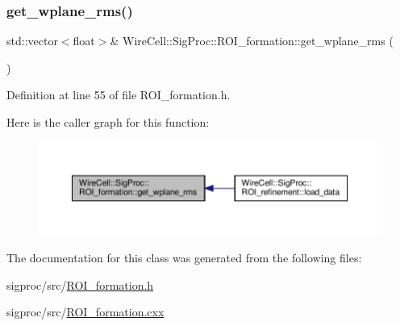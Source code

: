\subsubsection{\texorpdfstring{get\+\_\+wplane\+\_\+rms()}{get\_wplane\_rms()}}
{\footnotesize\ttfamily std\+::vector$<$float$>$\& Wire\+Cell\+::\+Sig\+Proc\+::\+R\+O\+I\+\_\+formation\+::get\+\_\+wplane\+\_\+rms (\begin{DoxyParamCaption}{ }\end{DoxyParamCaption})\hspace{0.3cm}{\ttfamily [inline]}}



Definition at line 55 of file R\+O\+I\+\_\+formation.\+h.

Here is the caller graph for this function\+:
\nopagebreak
\begin{figure}[H]
\begin{center}
\leavevmode
\includegraphics[width=350pt]{class_wire_cell_1_1_sig_proc_1_1_r_o_i__formation_afe5f0a8059b5d5b9b7e34077fea64c0a_icgraph}
\end{center}
\end{figure}


The documentation for this class was generated from the following files\+:\begin{DoxyCompactItemize}
\item 
sigproc/src/\hyperlink{_r_o_i__formation_8h}{R\+O\+I\+\_\+formation.\+h}\item 
sigproc/src/\hyperlink{_r_o_i__formation_8cxx}{R\+O\+I\+\_\+formation.\+cxx}\end{DoxyCompactItemize}
